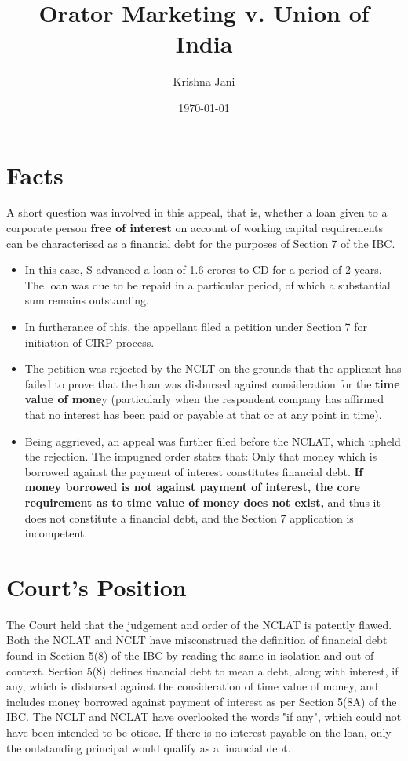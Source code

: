 \documentclass[12pt]{article}
\author{Krishna Jani}
\date{\today}
\title{Orator Marketing v. Union of India}
\begin{document}
\maketitle

\section*{Facts}

A short question was involved in this appeal, that is, whether a loan given to a corporate person \textbf{free of interest} on account of working capital requirements can be characterised as a financial debt for the purposes of Section 7 of the IBC.

\begin{itemize}
\item In this case, S advanced a loan of 1.6 crores to CD for a period of 2 years. The loan was due to be repaid in a particular period, of which a substantial sum remains outstanding. 
\item In furtherance of this, the appellant filed a petition under Section 7 for initiation of CIRP process. 
\item The petition was rejected by the NCLT on the grounds that the applicant has failed to prove that the loan was disbursed against consideration for the \textbf{time value of mone}y (particularly when the respondent company has affirmed that no interest has been paid or payable at that or at any point in time).
\item Being aggrieved, an appeal was further filed before the NCLAT, which upheld the rejection. The impugned order states that: Only that money which is borrowed against the payment of interest constitutes financial debt. \textbf{If money borrowed is not against payment of interest, the core requirement as to time value of money does not exist,} and thus it does not constitute a financial debt, and the Section 7 application is incompetent. 
 
\end{itemize}

\section*{Court's Position}

The Court held that the judgement and order of the NCLAT is patently flawed. Both the NCLAT and NCLT have misconstrued the definition of financial debt found in Section 5(8) of the IBC by reading the same in isolation and out of context. Section 5(8) defines financial debt to mean a debt, along with interest, if any, which is disbursed against the consideration of time value of money, and includes money borrowed against payment of interest as per Section 5(8A) of the IBC. The NCLT and NCLAT have overlooked the words "if any", which could not have been intended to be otiose. If there is no interest payable on the loan, only the outstanding principal would qualify as a financial debt.
\end{document}
